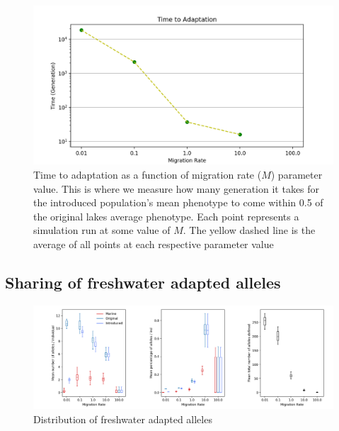 \documentclass{article}
\begin{document}
\begin{figure}
	\begin{center}
  		\includegraphics[width=1.0\linewidth]{semi_final_plots/T_adapt_semi_final.png}
  		\caption{
		Time to adaptation as a function of migration rate ($M$) parameter value. This is where we measure how many generation
		it takes for the introduced population's mean phenotype to come within 0.5 of the original lakes average phenotype. 
		Each point represents a simulation run at some value of $M$. 
		The yellow dashed line is the average of all points at each respective parameter value}
  		\label{fig:TimeToAdaptation}
	\end{center}
\end{figure}

\subsection*{Sharing of freshwater adapted alleles}

\begin{figure}
	\begin{center}
  		\includegraphics[width=\linewidth]{semi_final_plots/FAA_semi_final.png}
  		\caption{
		Distribution of freshwater adapted alleles 
		}
		\label{fig:MPFAI}
	\end{center}
\end{figure}
\end{document}
